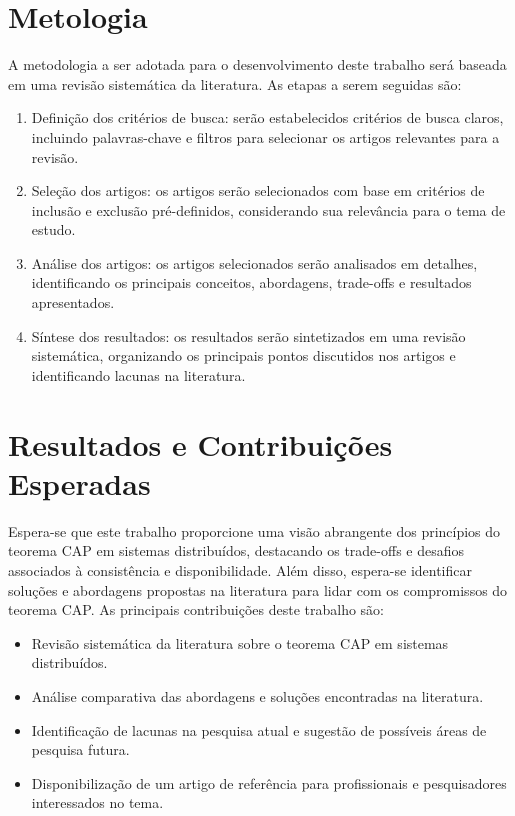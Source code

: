 \section{Metologia}
A metodologia a ser adotada para o desenvolvimento deste trabalho será baseada em uma revisão sistemática da literatura. As etapas a serem seguidas são:
\begin{enumerate}
    \item Definição dos critérios de busca: serão estabelecidos critérios de busca claros, incluindo palavras-chave e filtros para selecionar os artigos relevantes para a revisão.
    \item Seleção dos artigos: os artigos serão selecionados com base em critérios de inclusão e exclusão pré-definidos, considerando sua relevância para o tema de estudo.
    \item Análise dos artigos: os artigos selecionados serão analisados em detalhes, identificando os principais conceitos, abordagens, trade-offs e resultados apresentados.
    \item Síntese dos resultados: os resultados serão sintetizados em uma revisão sistemática, organizando os principais pontos discutidos nos artigos e identificando lacunas na literatura.
\end{enumerate}

\section{Resultados e Contribuições Esperadas}
Espera-se que este trabalho proporcione uma visão abrangente dos princípios do teorema CAP em sistemas distribuídos, destacando os trade-offs e desafios associados à consistência e disponibilidade. Além disso, espera-se identificar soluções e abordagens propostas na literatura para lidar com os compromissos do teorema CAP. As principais contribuições deste trabalho são:

\begin{itemize}
    \item Revisão sistemática da literatura sobre o teorema CAP em sistemas distribuídos.
    \item Análise comparativa das abordagens e soluções encontradas na literatura.
    \item Identificação de lacunas na pesquisa atual e sugestão de possíveis áreas de pesquisa futura.
    \item Disponibilização de um artigo de referência para profissionais e pesquisadores interessados no tema.
\end{itemize}

